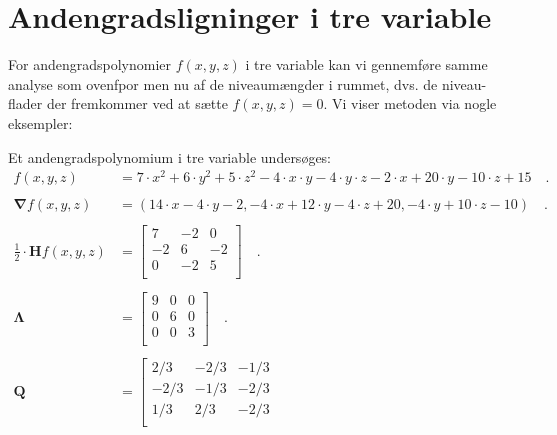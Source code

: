 \section{Andengradsligninger i tre variable} \label{chpSymmMat}

For andengradspolynomier $f(x,y,z)$ i tre variable kan vi gennemføre samme analyse som ovenfpor men nu af de niveaumængder i rummet, dvs. de niveau-flader der fremkommer ved at sætte $f(x,y, z)=0$. Vi viser metoden via nogle eksempler:

\begin{example}[Ellipsoide] \label{exampEllip3D01}
Et andengradspolynomium i tre variable undersøges:
\begin{equation}
\begin{aligned}
f(x,y,z) &= 7\cdot x^{2} + 6\cdot y^{2} + 5\cdot z^{2} - 4\cdot x\cdot y - 4\cdot y \cdot z  -2\cdot x +20 \cdot y  - 10\cdot z + 15 \quad . \\   \\
\bm{\nabla}f(x,y,z) &= (14\cdot x -4\cdot y-2, -4\cdot x + 12\cdot y - 4 \cdot z +20, -4\cdot y + 10\cdot z -10  ) \quad . \\  \\
\frac{1}{2}\cdot \mathbf{H}f(x,y,z) &= \left[
                     \begin{array}{ccc}
                       7 & -2 & 0\\
                       -2 & 6 & -2 \\
                       0 & -2 & 5\\
                     \end{array}
                   \right] \quad . \\  \\
\bm{\Lambda} &= \left[
                     \begin{array}{ccc}
                       9 & 0 & 0 \\
                       0 & 6 & 0 \\
                       0 & 0 & 3 \\
                     \end{array}
                   \right] \quad . \\  \\
\mathbf{Q} &= \left[
                     \begin{array}{ccc}
                       2/3 & -2/3 & -1/3 \\
                      -2/3& -1/3& -2/3\\
                       1/3 & 2/3 & -2/3\\

\end{array}
\end{aligned}
\end{equation}
\end{example}

